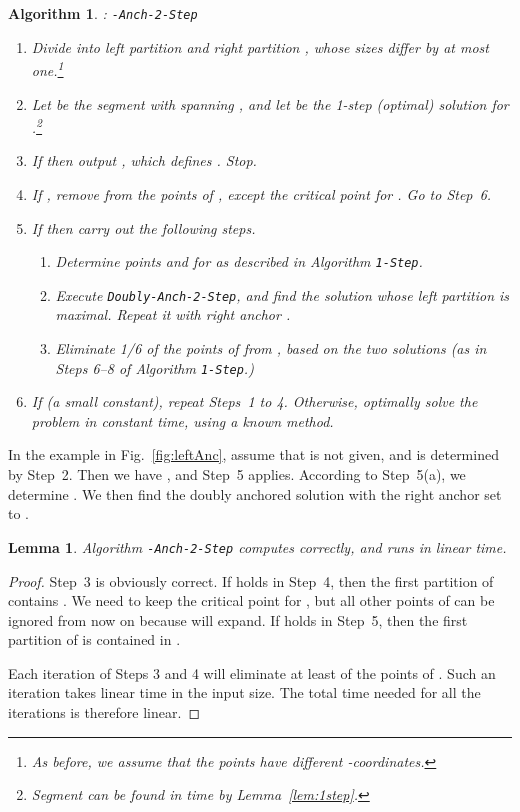 \documentclass[preprint,10pt]{elsarticle}
\newtheorem{lemma}{Lemma}
\newtheorem{algorithm}{Algorithm}
\begin{document}
\begin{algorithm}{\rm :} {\tt -Anch-2-Step}\label{alg:cond2}
\begin{enumerate}
\item
Divide  into left partition  and right partition ,
whose sizes differ by at most one.\footnote{As before,
we assume that the points have different -coordinates.
}
\item
Let  be the segment with  spanning ,
and let  be the 1-step (optimal) solution for .\footnote{
Segment  can be found in  time by Lemma~\ref{lem:1step}.}
\item
If  then
output , which defines .
Stop.
\item
If , remove from  the points of ,
except the critical point for .
Go to Step~6.
\item
If  then carry out the following steps.
\begin{enumerate}
\item
Determine points  and  for  as described in Algorithm {\tt 1-Step}.
\item
Execute {\tt Doubly-Anch-2-Step},
and find the solution whose left partition is maximal.
Repeat it with right anchor .
\item
Eliminate 1/6 of the points of  from , based on the two solutions
(as in Steps 6--8 of Algorithm {\tt 1-Step}.)
\end{enumerate}
\item
If  (a small constant),
repeat Steps~1 to 4.
Otherwise, optimally solve the problem in constant time, using a known method.
\end{enumerate}
\end{algorithm}
In the example in Fig.~\ref{fig:leftAnc}, 
assume that  is not given,
and  is determined by Step~2.
Then we have ,
and Step~5 applies.
According to Step~5(a), we determine .
We then find the doubly anchored solution with the right anchor set to .


\begin{lemma}
Algorithm {\tt -Anch-2-Step} computes  correctly,
and runs in linear time.
\end{lemma}
\begin{proof}
Step~3 is obviously correct.
If  holds in Step~4,
then the first partition of  contains .
We need to keep the critical point for ,
but all other points of  can be ignored from now on
because  will expand.
If  holds in Step~5,
then the first partition of  is contained in .

Each iteration of Steps 3 and 4 will eliminate at least  of the points of .
Such an iteration takes linear time in the input size. 
The total time needed for all the iterations is therefore linear.
\end{proof}
\end{document}

